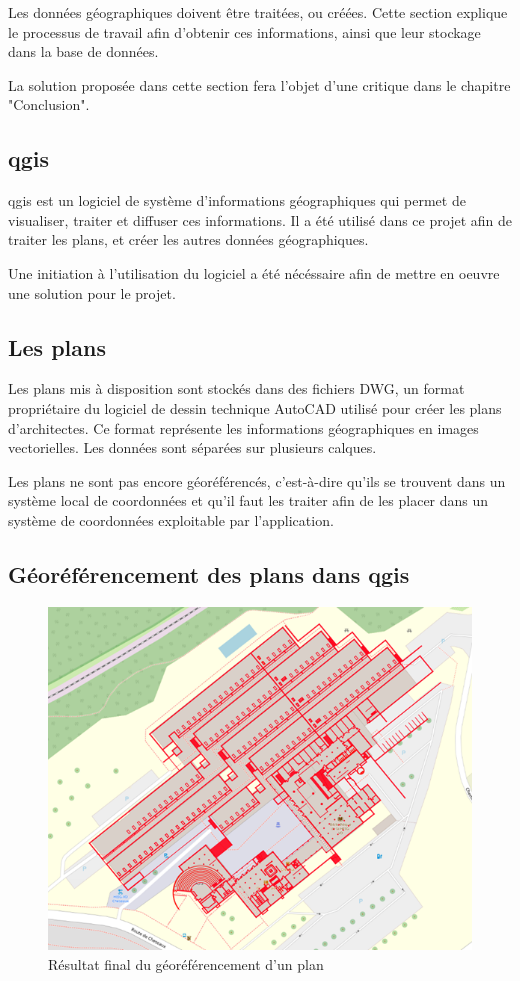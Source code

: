\documentclass[
    iai, %
    il, %
]{heig-tb}
\begin{document}
Les données géographiques doivent être traitées, ou créées.
Cette section explique le processus de travail afin d'obtenir ces informations, ainsi que leur stockage dans la base de données.

La solution proposée dans cette section fera l'objet d'une critique dans le chapitre "Conclusion".

\subsection{\gls{qgis}}
\gls{qgis} est un logiciel de système d'informations géographiques qui permet de visualiser, traiter et diffuser ces informations.
Il a été utilisé dans ce projet afin de traiter les plans, et créer les autres données géographiques.

Une initiation à l'utilisation du logiciel a été nécéssaire afin de mettre en oeuvre une solution pour le projet.

\subsection{Les plans}
Les plans mis à disposition sont stockés dans des fichiers DWG, un format propriétaire du logiciel de dessin technique AutoCAD utilisé pour créer les plans d'architectes.
Ce format représente les informations géographiques en images vectorielles.
Les données sont séparées sur plusieurs calques.

Les plans ne sont pas encore géoréférencés, c'est-à-dire qu'ils se trouvent dans un système local de coordonnées
et qu'il faut les traiter afin de les placer dans un système de coordonnées exploitable par l'application.

\subsection{Géoréférencement des plans dans \gls{qgis}}
\begin{figure}[h]
    \centering
    \includegraphics[scale=0.5]{Géoréférencement.png}
    \caption{Résultat final du géoréférencement d'un plan}
    \label{fig:georeferencement}
\end{figure}
\end{document}
